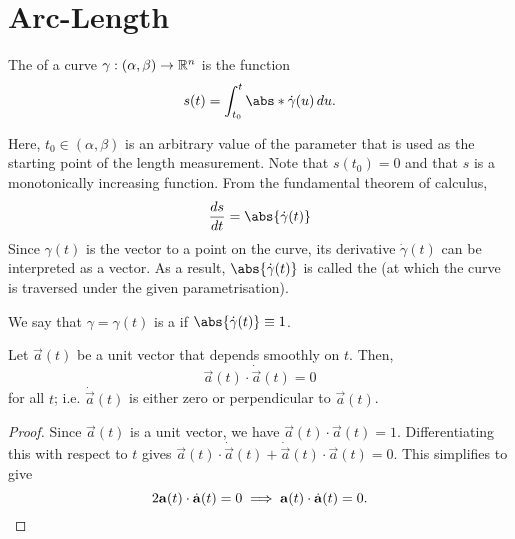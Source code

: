 \documentclass[11pt]{penrose}
\begin{document}
\section{Arc-Length}
\begin{ndfn}
    The  of a curve $\gamma : (\alpha, \beta) \to \R^n$ is the function
    \begin{equation}
        s(t) = \int_{t_0}^{t} \abs*{\dot{\gamma}(u)} \,du.
        \label{eq:arclength-dfn}
    \end{equation}
\end{ndfn}

Here, $t_0 \in (\alpha, \beta)$ is an arbitrary value of the parameter that is used as the starting point of the length measurement. Note that $s(t_0) = 0$ and that $s$ is a monotonically increasing function. From the fundamental theorem of calculus,
\begin{equation}
    \frac{ds}{dt} = \abs{\dot{\gamma}(t)}
    \label{eq:speed-dfn}
\end{equation}
Since $\gamma(t)$ is the  vector to a point on the curve, its derivative $\dot{\gamma}(t)$ can be interpreted as a  vector. As a result, $\abs{\dot{\gamma}(t)}$ is called the  (at which the curve is traversed under the given parametrisation).

\begin{ndfn}
    We say that $\gamma = \gamma(t)$ is a  if $\abs{\dot{\gamma}(t)} \equiv 1$.
\end{ndfn}

\begin{nprop}\label{prop:unit-vector-perp}
    Let $\vec{a}(t)$ be a unit vector that depends smoothly on $t$. Then,
    \begin{equation}
        \vec{a}(t) \cdot \dot{\vec{a}}(t) = 0
    \end{equation}
    for all $t$; i.e. $\dot{\vec{a}}(t)$ is either zero or perpendicular to $\vec{a}(t)$.
\end{nprop}
\begin{proof}
    Since $\vec{a}(t)$ is a unit vector, we have $\vec{a}(t) \cdot \vec{a}(t) = 1$. Differentiating this with respect to $t$ gives $\vec{a}(t) \cdot \dot{\vec{a}}(t) + \dot{\vec{a}}(t) \cdot \vec{a}(t) = 0$. This simplifies to give
    \begin{equation}
        2 \vec{a}(t) \cdot \dot{\vec{a}}(t) = 0
        \implies
        \vec{a}(t) \cdot \dot{\vec{a}}(t) = 0.\qedhere
    \end{equation}
\end{proof}
\end{document}
